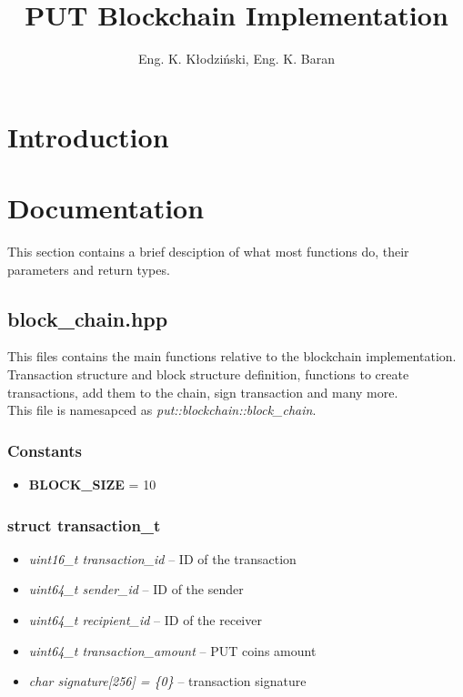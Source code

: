 \documentclass{article}
\title{PUT Blockchain Implementation}
\author{Eng. K. Kłodziński, Eng. K. Baran}
\begin{document}
\maketitle
\newpage

\tableofcontents
\newpage

\section{Introduction}

\section{Documentation}
This section contains a brief desciption of what most functions do, their parameters and return types.

\subsection{block\_chain.hpp}
This files contains the main functions relative to the blockchain implementation. Transaction structure and block structure definition, functions to create transactions, add them to the chain, sign transaction and many more. \\

This file is namesapced as \textit{put::blockchain::block\_chain}.

\subsubsection{Constants}
\begin{itemize}
\item \textbf{BLOCK\_SIZE} = 10
\end{itemize}

\subsubsection{struct transaction\_t}
\begin{itemize}
\item \textit{uint16\_t transaction\_id} -- ID of the transaction
\item \textit{uint64\_t sender\_id} -- ID of the sender
\item \textit{uint64\_t recipient\_id} -- ID of the receiver
\item \textit{uint64\_t transaction\_amount} -- PUT coins amount
\item \textit{char signature[256] = \{0\}} -- transaction signature
\end{itemize}
\end{document}
